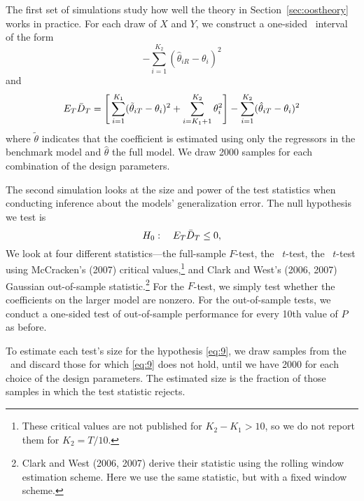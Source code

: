 \documentclass[11pt]{article}
\begin{document}
The first set of simulations study how well the theory in
Section~\ref{sec:oostheory} works in practice.  For each draw of $X$
and $Y$, we construct a one-sided \oos\ interval of the
form
\begin{equation*}
  [ \oosA - 1.28 \hat{\sigma_R}, \infty) \quad\text{with}\quad
  \hat\sigma_R^2 = \frac1P \sum_{t=R+1}^T (D_t - \oosA)^{2}
\end{equation*}
for $P$ set to every 10th value between 1 and $2T/3$.  We calculate
the percentage of these intervals that contain $\E_R \oosA$ and that
contain $\E_T \oosB$.  Since the data are i.i.d., both of these
quantities are easy to calculate:
\begin{equation*}
  E_R \oosA = \Bigg[\sum_{i=1}^{K_1} (\tilde{\theta}_{iR} - \theta_i)^2 +
  \sum_{i=K_1+1}^{K_2}\theta_i^2\Bigg] - \sum_{i=1}^{K_2} (\hat{\theta}_{iR} -
  \theta_i)^2
\end{equation*}
and
\begin{equation*}
  E_T \bar{D}_{T} = \Bigg[\sum_{i=1}^{K_1} (\tilde{\theta}_{iT} - \theta_i)^2 +
  \sum_{i=K_1+1}^{K_2}\theta_i^2\Bigg] - \sum_{i=1}^{K_2} (\hat{\theta}_{iT} -
  \theta_i)^2
\end{equation*}
where $\tilde{\theta}$ indicates that the coefficient is estimated
using only the regressors in the benchmark model and $\hat{\theta}$
the full model.  We draw 2000 samples for each combination of the
design parameters.

The second simulation looks at the size and power of the test
statistics when conducting inference about the models' generalization
error.  The null hypothesis we test is 
\begin{equation}\label{eq:9}
  H_0:\quad E_T \bar{D}_{T} \leq 0,
\end{equation}
We look at four different statistics---the full-sample $F$-test, the
\dmw\ $t$-test, the
\oos\ $t$-test using McCracken's (2007)
critical values,\footnote{These critical values are not published for
  $K_2-K_1>10$, so we do not report them for $K_2 = T/10$.}
and Clark and West's (2006, 2007) Gaussian out-of-sample
statistic.\footnote{Clark and West (2006, 2007) derive their statistic
using the rolling window estimation scheme.  Here we use the same
statistic, but with a fixed window scheme.}
For the $F$-test, we simply test whether the coefficients on the larger
model are nonzero.  For the out-of-sample tests, we conduct a
one-sided test of out-of-sample performance for every 10th value of
$P$ as before.

To estimate each test's size for the hypothesis \eqref{eq:9}, we draw
samples from the \dgp\ and discard those for which \eqref{eq:9} does
not hold, until we have 2000 for each choice of the design parameters.
The estimated size is the fraction of those samples in which the test
statistic rejects.
\end{document}
